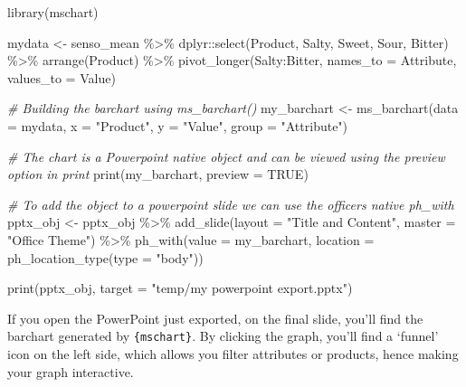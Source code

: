 \documentclass[
]{book}
\newenvironment{Shaded}{\begin{snugshade}}{\end{snugshade}}
\newcommand{\AttributeTok}[1]{\textcolor[rgb]{0.77,0.63,0.00}{#1}}
\newcommand{\CommentTok}[1]{\textcolor[rgb]{0.56,0.35,0.01}{\textit{#1}}}
\newcommand{\ConstantTok}[1]{\textcolor[rgb]{0.00,0.00,0.00}{#1}}
\newcommand{\FunctionTok}[1]{\textcolor[rgb]{0.00,0.00,0.00}{#1}}
\newcommand{\NormalTok}[1]{#1}
\newcommand{\OtherTok}[1]{\textcolor[rgb]{0.56,0.35,0.01}{#1}}
\newcommand{\SpecialCharTok}[1]{\textcolor[rgb]{0.00,0.00,0.00}{#1}}
\newcommand{\StringTok}[1]{\textcolor[rgb]{0.31,0.60,0.02}{#1}}
\begin{document}
\begin{Shaded}
\begin{Highlighting}[]
\FunctionTok{library}\NormalTok{(mschart)}

\NormalTok{mydata }\OtherTok{\textless{}{-}}\NormalTok{ senso\_mean }\SpecialCharTok{\%\textgreater{}\%}
\NormalTok{  dplyr}\SpecialCharTok{::}\FunctionTok{select}\NormalTok{(Product, Salty, Sweet, Sour, Bitter) }\SpecialCharTok{\%\textgreater{}\%} 
  \FunctionTok{arrange}\NormalTok{(Product) }\SpecialCharTok{\%\textgreater{}\%} 
  \FunctionTok{pivot\_longer}\NormalTok{(Salty}\SpecialCharTok{:}\NormalTok{Bitter, }\AttributeTok{names\_to =} \StringTok{\textquotesingle{}Attribute\textquotesingle{}}\NormalTok{, }\AttributeTok{values\_to =} \StringTok{\textquotesingle{}Value\textquotesingle{}}\NormalTok{)}

\CommentTok{\# Building the barchart using ms\_barchart()}
\NormalTok{my\_barchart }\OtherTok{\textless{}{-}} \FunctionTok{ms\_barchart}\NormalTok{(}\AttributeTok{data =}\NormalTok{ mydata,}
                           \AttributeTok{x =} \StringTok{"Product"}\NormalTok{,}
                           \AttributeTok{y =} \StringTok{"Value"}\NormalTok{,}
                           \AttributeTok{group =} \StringTok{"Attribute"}\NormalTok{)}

\CommentTok{\# The chart is a Powerpoint native object and can be viewed using the preview option in print}
\FunctionTok{print}\NormalTok{(my\_barchart, }\AttributeTok{preview =} \ConstantTok{TRUE}\NormalTok{)}

\CommentTok{\# To add the object to a powerpoint slide we can use the officer\textquotesingle{}s native ph\_with}
\NormalTok{pptx\_obj }\OtherTok{\textless{}{-}}\NormalTok{ pptx\_obj }\SpecialCharTok{\%\textgreater{}\%}
  \FunctionTok{add\_slide}\NormalTok{(}\AttributeTok{layout =} \StringTok{"Title and Content"}\NormalTok{, }\AttributeTok{master =} \StringTok{"Office Theme"}\NormalTok{) }\SpecialCharTok{\%\textgreater{}\%}
  \FunctionTok{ph\_with}\NormalTok{(}\AttributeTok{value =}\NormalTok{ my\_barchart, }\AttributeTok{location =} \FunctionTok{ph\_location\_type}\NormalTok{(}\AttributeTok{type =} \StringTok{"body"}\NormalTok{))}

\FunctionTok{print}\NormalTok{(pptx\_obj, }\AttributeTok{target =} \StringTok{"temp/my powerpoint export.pptx"}\NormalTok{)}
\end{Highlighting}
\end{Shaded}

If you open the PowerPoint just exported, on the final slide, you'll find the barchart generated by \texttt{\{mschart\}}. By clicking the graph, you'll find a `funnel' icon on the left side, which allows you filter attributes or products, hence making your graph interactive.
\end{document}
